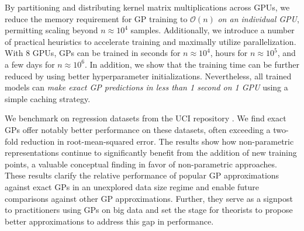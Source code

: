 By partitioning and distributing kernel matrix multiplications across GPUs, we
reduce the memory requirement for GP training to $\mathcal{O}(n)$ \emph{on an individual GPU}, permitting scaling beyond $n\approx 10^4$ samples.
Additionally, we introduce a number of practical heuristics to accelerate training and maximally utilize parallelization.
With $8$ GPUs, GPs can be trained in seconds for $n \approx 10^4$, hours for $n \approx 10^5$, and a few days for $n \approx 10^6$. In addition, we show that the training time can be further reduced by using better hyperparameter initializations.
Nevertheless, all trained models can \emph{make exact GP predictions in less than 1 second on 1 GPU} using a simple caching strategy.

We benchmark on regression datasets from the UCI repository
\citep{asuncion2007uci}. We find exact GPs offer notably better performance on
these datasets, often exceeding a two-fold reduction in root-mean-squared error.
The results show how non-parametric representations continue to significantly benefit from the addition of new training points, a valuable conceptual finding in favor of non-parametric approaches.
These results clarify the relative performance of popular GP approximations
against exact GPs in an unexplored data size regime and enable future
comparisons against other GP approximations. Further, they serve as a signpost to
practitioners using GPs on big data and set the stage for theorists to propose better approximations to address this gap in performance.
